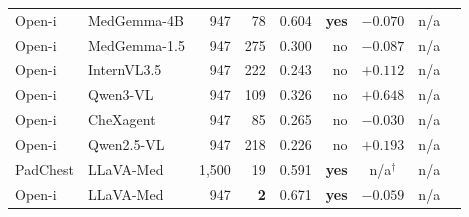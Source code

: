 \begin{table}[H]
\begin{tabular}{llrrrrcrr}
\midrule
Open-i & MedGemma-4B & 947 & 78 & 0.604 & \textbf{yes} & $-0.070$ & n/a \\
Open-i & MedGemma-1.5 & 947 & 275 & 0.300 & no & $-0.087$ & n/a \\
Open-i & InternVL3.5 & 947 & 222 & 0.243 & no & $+0.112$ & n/a \\
Open-i & Qwen3-VL & 947 & 109 & 0.326 & no & $+0.648$ & n/a \\
Open-i & CheXagent & 947 & 85 & 0.265 & no & $-0.030$ & n/a \\
Open-i & Qwen2.5-VL & 947 & 218 & 0.226 & no & $+0.193$ & n/a \\
\midrule
PadChest & LLaVA-Med & 1,500 & 19 & 0.591 & \textbf{yes} & n/a$^{\dagger}$ & n/a \\
Open-i & LLaVA-Med & 947 & \textbf{2} & 0.671 & \textbf{yes} & $-0.059$ & n/a \\
\bottomrule
\end{tabular}
\end{table}

